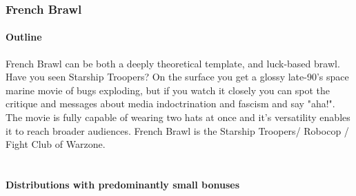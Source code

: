 \subsubsection{French Brawl}

\paragraph{Outline}

French Brawl can be both a deeply theoretical template, and luck-based brawl. Have you seen Starship Troopers? On the surface you get a glossy late-90's space marine movie of bugs exploding, but if you watch it closely you can spot the critique and messages about media indoctrination and fascism and say "aha!". The movie is fully capable of wearing two hats at once and it's versatility enables it to reach broader audiences. French Brawl is the Starship Troopers/ Robocop / Fight Club of Warzone.
\\
\\
\paragraph{Distributions with predominantly small bonuses}


